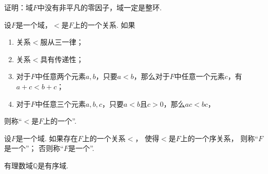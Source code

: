 %

\begin{example}
证明：域\(F\)中没有非平凡的零因子，域一定是整环.
\end{example}

\begin{definition}
设\(F\)是一个域，\(<\)是\(F\)上的一个关系.
如果\begin{enumerate}
	\item 关系\(<\)服从三一律；
	\item 关系\(<\)具有传递性；
	\item 对于\(F\)中任意两个元素\(a,b\)，只要\(a<b\)，那么对于\(F\)中任意一个元素\(c\)，有\(a+c<b+c\)；
	\item 对于\(F\)中任意三个元素\(a,b,c\)，只要\(a<b\)且\(c>0\)，那么\(ac<bc\)，
\end{enumerate}
则称“\(<\)是\(F\)上的一个”.
\end{definition}

\begin{definition}
设\(F\)是一个域.
如果存在\(F\)上的一个关系\(<\)，
使得\(<\)是\(F\)上的一个序关系，
则称“\(F\)是一个”；
否则称“\(F\)是一个”.
\end{definition}

\begin{theorem}
有理数域\(\mathbb{Q}\)是有序域.
\end{theorem}

